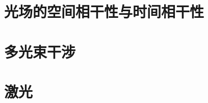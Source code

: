 \documentclass[UTF8]{report}
\theoremstyle{MyLineTheoremStyle} %
\theoremstyle{MyBlockTheoremStyle} %
\theoremstyle{MySubsubsectionStyle} %
\begin{document}
\section{光场的空间相干性与时间相干性}
\section{多光束干涉}
\section{激光}
\end{document}
